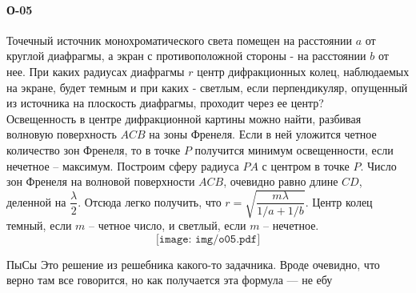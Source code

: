 \documentclass[__main__.tex]{subfiles}
\begin{document}
\paragraph{О-05}
Точечный источник монохроматического света помещен на расстоянии $a$ от круглой диафрагмы, а экран с противоположной стороны - на расстоянии $b$ от нее. При каких радиусах диафрагмы $r$ центр дифракционных колец, наблюдаемых на экране, будет темным и при каких - светлым, если перпендикуляр, опущенный из источника на плоскость диафрагмы, проходит через ее центр?\\

Освещенность в центре дифракционной картины можно найти, разбивая волновую поверхность $ACB$ на зоны Френеля. Если в ней уложится четное количество зон Френеля, то в точке $P$ получится минимум освещенности, если нечетное -- максимум. Построим сферу радиуса $PA$ с центром в точке $P$. Число зон Френеля на волновой поверхности $ACB$, очевидно равно длине $CD$, деленной на $\dfrac{\lambda}{2}$. Отсюда легко получить, что $r=\sqrt{\dfrac{m\lambda}{1/a+1/b}}$. Центр колец темный, если $m$ -- четное число, и светлый, если $m$ -- нечетное.
$$
\texttt{[image: img/o05.pdf]}
$$

ПыСы Это решение из решебника какого-то задачника. Вроде очевидно, что верно там все говорится, но как получается эта формула --- не ебу
\end{document}
